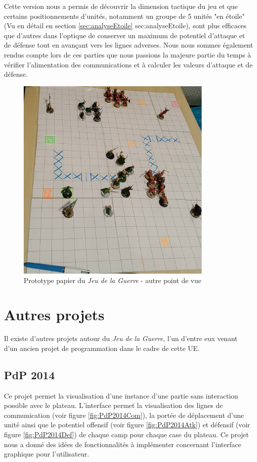 \documentclass[a4paper]{report}
\begin{document}
Cette version nous a permis de découvrir la dimension tactique du jeu et que certains positionnements d'unités, notamment un groupe de 5 unités "en étoile" (Vu en détail en section \ref{sec:analyseEtoile} \refname{sec:analyseEtoile}), sont plus efficaces que d'autres dans l'optique de conserver un maximum de potentiel d'attaque et de défense tout en avançant vers les lignes adverses. Nous nous sommes également rendus compte lors de ces parties que nous passions la majeure partie du temps à vérifier l'alimentation des communications et à calculer les valeurs d'attaque et de défense.

\begin{figure}[h]
\centering
\includegraphics[width=0.85\textwidth]{existantPlateau/plateauMaison}
\caption{Prototype papier du {\it Jeu de la Guerre} - autre point de vue}\label{fig:plateau_irl2}
\end{figure}

\section{Autres projets}

Il existe d'autres projets autour du \textit{Jeu de la Guerre}, l'un d'entre eux venant d'un ancien projet de programmation dans le cadre de cette UE.


\subsection*{PdP 2014}
Ce projet\cite{pdp2014} permet la visualisation d'une instance d'une partie sans interaction possible avec le plateau. L'interface permet la visualisation des lignes de communication (voir figure \ref{fig:PdP2014Com}), la portée de déplacement d'une unité ainsi que le potentiel offensif (voir figure \ref{fig:PdP2014Atk}) et défensif (voir figure \ref{fig:PdP2014Def}) de chaque camp pour chaque case du plateau.
Ce projet nous a donné des idées de fonctionnalités à implémenter concernant l'interface graphique pour l'utilisateur. 
\end{document}
